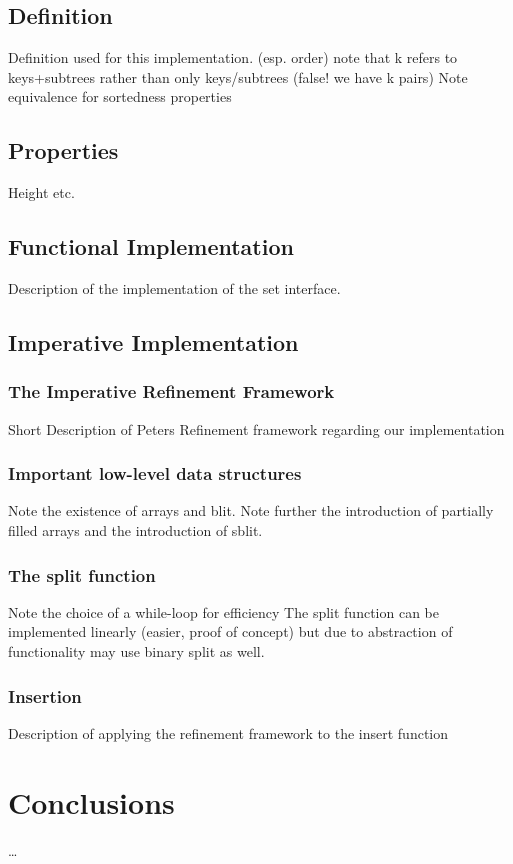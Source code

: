 \section{Definition}

Definition used for this implementation.
(esp. order)
note that k refers to keys+subtrees rather than only keys/subtrees (false! we have k pairs)
Note equivalence for sortedness properties

\section{Properties}

Height etc.

\section{Functional Implementation}

Description of the implementation of the set interface.

\section{Imperative Implementation}

\subsection{The Imperative Refinement Framework}

Short Description of Peters Refinement framework regarding our implementation

\subsection{Important low-level data structures}

Note the existence of arrays and blit.
Note further the introduction of partially filled arrays
and the introduction of sblit.

\subsection{The split function}

Note the choice of a while-loop for efficiency
The split function can be implemented linearly (easier, proof of concept)
but due to abstraction of functionality may use binary split as well.

\subsection{Insertion}

Description of applying the refinement framework to the insert function

\chapter{Conclusions}

\dots